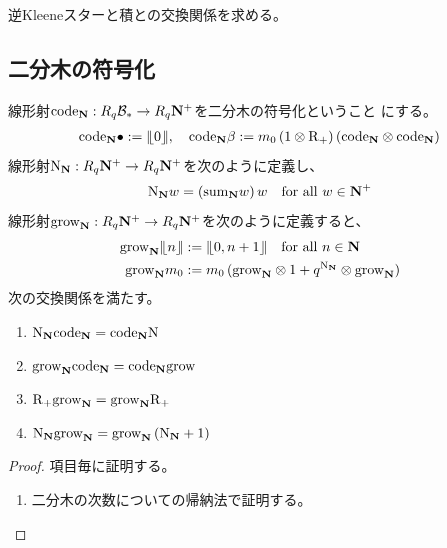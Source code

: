 {	\begin{todo}[Leibniz則とKleeneスター]\label{todo:Leibniz則とKleeneスター} %
		逆Kleeneスターと積との交換関係を求める。
	\end{todo} %
\subsection{二分木の符号化}\label{s2:二分木の符号化} %
	線形射$\code_\sizen:R_q\clB_*\to R_q\sizen^+$を二分木の符号化ということ
	にする。
	\begin{equation*}\begin{split}
		\code_\sizen\bullet := \word{0}
		,\quad \code_\sizen\beta := m_0\plr{1\otimes\opR_+}
		\plr{\code_\sizen\otimes\code_\sizen}
	\end{split}\end{equation*}
	線形射$\opN_\sizen:R_q\sizen^+\to R_q\sizen^+$を次のように定義し、
	\begin{equation*}\begin{split}
		\opN_\sizen w = \plr{\sumw_\sizen w}w \quad\text{for all } w\in\sizen^+
	\end{split}\end{equation*}
	線形射$\grow_\sizen:R_q\sizen^+\to R_q\sizen^+$を次のように定義すると、
	\begin{equation*}\begin{split}
		\grow_\sizen\word{n} &:= \word{0,n+1} \quad\text{for all } n\in\sizen \\
		\grow_\sizen m_0 &:= m_0\plr{\grow_\sizen\otimes1 
		+ q^{\opN_\sizen}\otimes\grow_\sizen}
	\end{split}\end{equation*}
	次の交換関係を満たす。
	\begin{enumerate}\setlength{\itemsep}{-1mm} %
		\item $\opN_\sizen\code_\sizen = \code_\sizen\opN$
		\item $\grow_\sizen\code_\sizen = \code_\sizen\grow$
		\item\label{eq:自然数列の成長その一} $\opR_+\grow_\sizen = \grow_\sizen\opR_+$
		\item\label{eq:自然数列の成長その二} $\opN_\sizen\grow_\sizen = \grow_\sizen\plr{\opN_\sizen + 1}$
	\end{enumerate} %
	\begin{proof} %
		項目毎に証明する。
		\begin{enumerate}\setlength{\itemsep}{-1mm} %
			\item 二分木の次数についての帰納法で証明する。

\end{enumerate}
\end{proof}}
